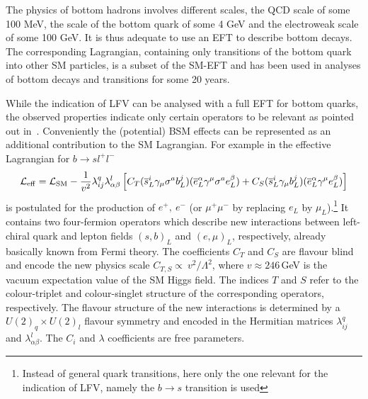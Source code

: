The physics of bottom hadrons involves different scales, the QCD scale of
some 100 MeV, the scale of the bottom quark of some 4 GeV and the
electroweak scale of some 100 GeV. It is thus adequate to use an EFT to
describe bottom decays.  The corresponding Lagrangian, containing only
transitions of the bottom quark into other SM particles, is a subset
of the SM-EFT and has been used in analyses of bottom decays and
transitions for some 20 years.

While the indication of LFV can be analysed with a full EFT for bottom
quarks, the observed properties indicate only certain operators to be
relevant as pointed out in~\citet{Buttazzo:2017ixm}. Conveniently the
(potential) BSM effects can be represented as an additional
contribution to the SM Lagrangian. For example in
\citet{Buttazzo:2017ixm} the effective Lagrangian for
$b\rightarrow s l^+l^-$
\begin{equation}\label{eq:leff}
{\cal L}_{\rm eff} = {\cal L}_{\rm SM} - \frac{1}{v^2}\lambda^q_{ij}\lambda^l_{\alpha\beta}\left[C_T(\overline{s}^i_L\gamma_\mu\sigma^a b^j_L)(\overline{e}_L^\alpha\gamma^\mu\sigma^a e_L^\beta)+C_S(\overline{s}_L^i\gamma_\mu b_L^j)(\overline{e}_L^\alpha\gamma^\mu e_L^\beta)\right]
\end{equation}
is postulated for the production of $e^+,~e^-$ (or $\mu^+ \mu^-$ by
replacing $e_L$ by $\mu_L$).\footnote{Instead of general quark
  transitions, here only the one relevant for the indication of LFV,
  namely the $b\rightarrow s$ transition is used} It contains two
four-fermion operators which describe new interactions between
left-chiral quark and lepton fields $(s,b)_L$ and $(e,\mu )_L$,
respectively, already basically known from Fermi theory.  The
coefficients $C_T$ and $C_S$ are flavour blind and encode the new
physics scale $C_{T,S} \propto \ v^2/\Lambda^2$, where $v \approx
246$\,GeV is the vacuum expectation value of the SM Higgs field. The indices $T$ and $S$ refer
to the colour-triplet and colour-singlet structure of the
corresponding operators, respectively.  The flavour structure of the
new interactions is determined by a $U(2)_q\times U(2)_l$ flavour
symmetry and encoded in the Hermitian matrices $\lambda^q_{ij}$ and
$\lambda^l_{\alpha\beta}$. The $C_i$ and $\lambda $ coefficients are
free parameters.


